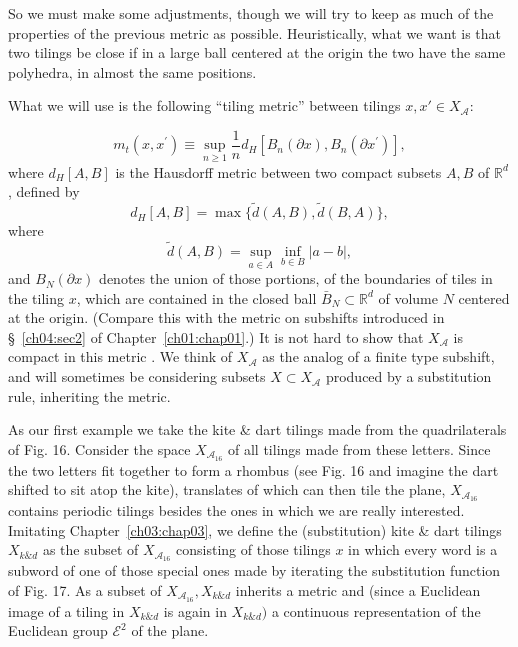 \documentclass[reqno]{stml-l}
\theoremstyle{plain}
\theoremstyle{definition}
\numberwithin{equation}{chapter}
\begin{document}
So we must make some adjustments, though we will try to keep as much of the properties of the previous metric as possible. Heuristically, what we want is that two tilings be close if in a large ball centered at the origin the two have the same polyhedra, in almost the same positions.

What we will use is the following ``tiling metric'' between tilings $x,x{\prime}\in X_{\mathcal{A}}$:

\begin{equation}\label{ch04:eqn4.1}
m_{t}(x, x^{\prime})\equiv\sup_{n\geq 1}\frac{1}{n}d_{H}[B_{n}(\partial x), B_{n}(\partial x^{\prime})],
\end{equation}
where $d_{H}[A, B]$ is the Hausdorff metric between two compact subsets $A,B$ of $\mathbb{R}^{d}$, defined by
\begin{equation}\label{ch04:eqn4.2}
d_{H}[A, B]=\max\{\tilde{d}(A, B),\tilde{d}(B, A)\},
\end{equation}
where
\begin{equation}\label{ch04:eqn4.3}
\tilde{d}(A, B)=\sup_{a\in A}\inf_{b\in B}|a-b|,
\end{equation}
and $B_{N}(\partial x)$ denotes the union of those portions, of the boundaries of tiles in the tiling $x$, which are contained in the closed ball $\bar{B}_{N}\subset \mathbb{R}^{d}$ of volume $N$ centered at the origin. (Compare this with the metric on subshifts introduced in \S~\ref{ch04:sec2} of Chapter~\ref{ch01:chap01}.) It is not hard to show that $X_{\mathcal{A}}$ is compact in this metric \cite{bib:RaW}. We think of $X_{\mathcal{A}}$ as the analog of a finite type subshift, and will sometimes be considering subsets $X\subset X_{\mathcal{A}}$ produced by a substitution rule, inheriting the metric.

As our first example we take the kite \& dart tilings made from the quadrilaterals of Fig. 16. Consider the space $X_{\mathcal{A}_{16}}$ of all tilings made from these letters. Since the two letters fit together to form a rhombus (see Fig. 16 and imagine the dart shifted to sit atop the kite), translates of which can then tile the plane, $X_{\mathcal{A}_{16}}$ contains periodic tilings besides the ones in which we are really interested. Imitating Chapter~\ref{ch03:chap03}, we define the (substitution) kite \& dart tilings $X_{k\& d}$ as the subset of $X_{\mathcal{A}_{16}}$ consisting of those tilings $x$ in which every word is a subword of one of those special ones made by iterating the substitution function of Fig. 17. As a subset of $X_{\mathcal{A}_{16}},X_{k\& d}$ inherits a metric and (since a Euclidean image of a tiling in $X_{k\& d}$ is again in $X_{k\& d})$ a continuous representation of the Euclidean group $\mathcal{E}^{2}$ of the plane.
\end{document}
